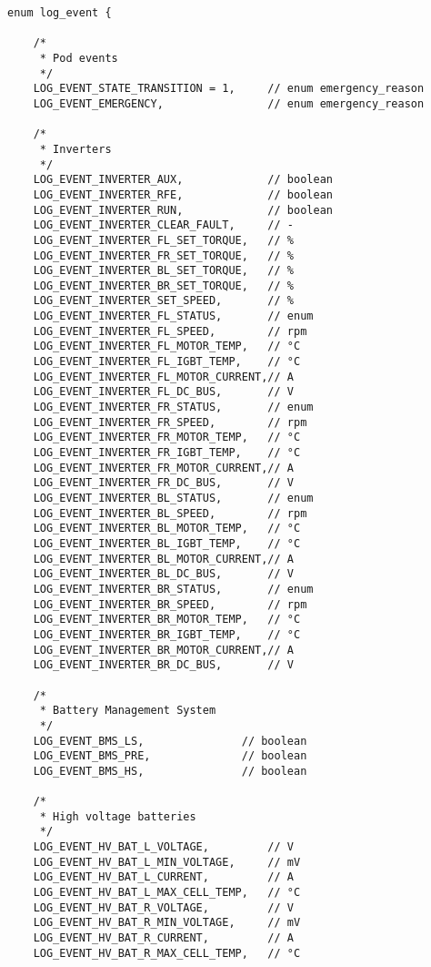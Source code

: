 \begin{verbatim}
enum log_event {

    /*
     * Pod events
     */
    LOG_EVENT_STATE_TRANSITION = 1,     // enum emergency_reason
    LOG_EVENT_EMERGENCY,                // enum emergency_reason

    /*
     * Inverters
     */
    LOG_EVENT_INVERTER_AUX,             // boolean
    LOG_EVENT_INVERTER_RFE,             // boolean
    LOG_EVENT_INVERTER_RUN,             // boolean
    LOG_EVENT_INVERTER_CLEAR_FAULT,     // -
    LOG_EVENT_INVERTER_FL_SET_TORQUE,   // %
    LOG_EVENT_INVERTER_FR_SET_TORQUE,   // %
    LOG_EVENT_INVERTER_BL_SET_TORQUE,   // %
    LOG_EVENT_INVERTER_BR_SET_TORQUE,   // %
    LOG_EVENT_INVERTER_SET_SPEED,       // %
    LOG_EVENT_INVERTER_FL_STATUS,       // enum
    LOG_EVENT_INVERTER_FL_SPEED,        // rpm
    LOG_EVENT_INVERTER_FL_MOTOR_TEMP,   // °C
    LOG_EVENT_INVERTER_FL_IGBT_TEMP,    // °C
    LOG_EVENT_INVERTER_FL_MOTOR_CURRENT,// A
    LOG_EVENT_INVERTER_FL_DC_BUS,       // V
    LOG_EVENT_INVERTER_FR_STATUS,       // enum
    LOG_EVENT_INVERTER_FR_SPEED,        // rpm
    LOG_EVENT_INVERTER_FR_MOTOR_TEMP,   // °C
    LOG_EVENT_INVERTER_FR_IGBT_TEMP,    // °C
    LOG_EVENT_INVERTER_FR_MOTOR_CURRENT,// A
    LOG_EVENT_INVERTER_FR_DC_BUS,       // V
    LOG_EVENT_INVERTER_BL_STATUS,       // enum
    LOG_EVENT_INVERTER_BL_SPEED,        // rpm
    LOG_EVENT_INVERTER_BL_MOTOR_TEMP,   // °C
    LOG_EVENT_INVERTER_BL_IGBT_TEMP,    // °C
    LOG_EVENT_INVERTER_BL_MOTOR_CURRENT,// A
    LOG_EVENT_INVERTER_BL_DC_BUS,       // V
    LOG_EVENT_INVERTER_BR_STATUS,       // enum
    LOG_EVENT_INVERTER_BR_SPEED,        // rpm
    LOG_EVENT_INVERTER_BR_MOTOR_TEMP,   // °C
    LOG_EVENT_INVERTER_BR_IGBT_TEMP,    // °C
    LOG_EVENT_INVERTER_BR_MOTOR_CURRENT,// A
    LOG_EVENT_INVERTER_BR_DC_BUS,       // V

    /*
     * Battery Management System
     */
    LOG_EVENT_BMS_LS,               // boolean
    LOG_EVENT_BMS_PRE,              // boolean
    LOG_EVENT_BMS_HS,               // boolean

    /*
     * High voltage batteries
     */
    LOG_EVENT_HV_BAT_L_VOLTAGE,         // V
    LOG_EVENT_HV_BAT_L_MIN_VOLTAGE,     // mV
    LOG_EVENT_HV_BAT_L_CURRENT,         // A
    LOG_EVENT_HV_BAT_L_MAX_CELL_TEMP,   // °C
    LOG_EVENT_HV_BAT_R_VOLTAGE,         // V
    LOG_EVENT_HV_BAT_R_MIN_VOLTAGE,     // mV
    LOG_EVENT_HV_BAT_R_CURRENT,         // A
    LOG_EVENT_HV_BAT_R_MAX_CELL_TEMP,   // °C


\end{verbatim}

